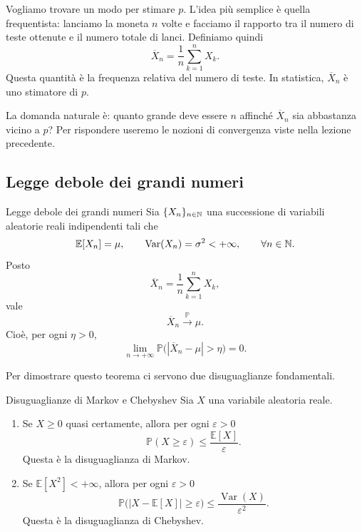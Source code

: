 \documentclass[a4paper]{article}
\begin{document}
Vogliamo trovare un modo per stimare \(p\). L'idea più semplice è quella frequentista: lanciamo la moneta \(n\) volte e facciamo il rapporto tra il numero di teste ottenute e il numero totale di lanci. Definiamo quindi
\[
    \overline{X}_n
    =
    \frac1n\sum_{k=1}^{n}X_k.
\]
Questa quantità è la frequenza relativa del numero di teste. In statistica, \(\overline{X}_n\) è uno stimatore di \(p\).

La domanda naturale è: quanto grande deve essere \(n\) affinché \(\overline{X}_n\) sia abbastanza vicino a \(p\)? Per rispondere useremo le nozioni di convergenza viste nella lezione precedente.

\subsection{Legge debole dei grandi numeri}

\begin{snippettheorem}{Legge debole dei grandi numeri}
    Sia \(\{X_n\}_{n\in\mathbb{N}}\) una successione di variabili aleatorie reali indipendenti tali che
    \[
        \mathbb{E}[X_n]=\mu,
        \qquad
        \operatorname{Var}(X_n)=\sigma^2<+\infty,
        \qquad
        \forall n\in\mathbb{N}.
    \]
    Posto
    \[
        \overline{X}_n=\frac1n\sum_{k=1}^{n}X_k,
    \]
    vale
    \[
        \overline{X}_n\xrightarrow{\mathbb{P}}\mu.
    \]
    Cioè, per ogni \(\eta>0\),
    \[
        \lim_{n\to+\infty}
        \mathbb{P}\bigl(|\overline{X}_n-\mu|>\eta\bigr)=0.
    \]
\end{snippettheorem}

Per dimostrare questo teorema ci servono due disuguaglianze fondamentali.

\begin{snippetproposition}{Disuguaglianze di Markov e Chebyshev}
    Sia \(X\) una variabile aleatoria reale.

    \begin{enumerate}
        \item Se \(X\geq0\) quasi certamente, allora per ogni \(\varepsilon>0\)
            \[
                \mathbb{P}(X\geq\varepsilon)
                \leq
                \frac{\mathbb{E}[X]}{\varepsilon}.
            \]
            Questa è la disuguaglianza di Markov.

        \item Se \(\mathbb{E}[X^2]<+\infty\), allora per ogni \(\varepsilon>0\)
            \[
                \mathbb{P}\bigl(|X-\mathbb{E}[X]|\geq \varepsilon\bigr)
                \leq
                \frac{\operatorname{Var}(X)}{\varepsilon^2}.
            \]
            Questa è la disuguaglianza di Chebyshev.
    \end{enumerate}
\end{snippetproposition}
\end{document}
